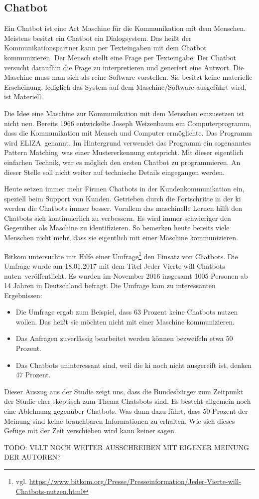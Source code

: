 \subsection{Chatbot}
Ein Chatbot ist eine Art Maschine für die Kommunikation mit dem Menschen. Meistens besitzt ein Chatbot ein Dialogsystem. Das heißt der Kommunikationspartner kann per Texteingaben mit dem Chatbot kommunizieren. Der Mensch stellt eine Frage per Texteingabe. Der Chatbot versucht daraufhin die Frage zu interpretieren und generiert eine Antwort. Die Maschine muss man sich als reine Software vorstellen. Sie besitzt keine materielle Erscheinung, lediglich das System auf dem Maschine/Software ausgeführt wird, ist Materiell.

Die Idee eine Maschine zur Kommunikation mit dem Menschen einzusetzen ist nicht neu. Bereits 1966 entwickelte Joseph Weizenbaum ein Computerprogramm, dass die Kommunikation mit Mensch und Computer ermöglichte. Das Programm wird \glqq ELIZA\grqq\ genannt. Im Hintergrund verwendet das Programm ein sogenanntes \glqq Pattern Matching\grqq\, was einer Mustererkennung entspricht. Mit dieser eigentlich einfachen Technik, war es möglich den ersten Chatbot zu programmieren. An dieser Stelle soll nicht weiter auf technische Details eingegangen werden.    

Heute setzen immer mehr Firmen Chatbots in der Kundenkommunikation ein, speziell beim Support von Kunden. Getrieben durch die Fortschritte in der \ac{ki} werden die Chatbots immer besser. Vorallem das maschinelle Lernen hilft den Chatbots sich kontinuierlich zu verbessern. Es wird immer schwieriger den Gegenüber als Maschine zu identifizieren. So bemerken heute bereits viele Menschen nicht mehr, dass sie eigentlich mit einer Maschine kommunizieren. 

Bitkom untersuchte mit Hilfe einer Umfrage\footnote{vgl. \url{https://www.bitkom.org/Presse/Presseinformation/Jeder-Vierte-will-Chatbots-nutzen.html}} den Einsatz von Chatbots. Die Umfrage wurde am 18.01.2017 mit dem Titel \glqq Jeder Vierte will Chatbots nuten\grqq\ veröffentlicht. Es wurden im November 2016 insgesamt 1005 Personen ab 14 Jahren in Deutschland befragt. Die Umfrage kam zu interessanten Ergebnissen:
\begin{itemize}
 	\item Die Umfrage ergab zum Beispiel, dass 63 Prozent keine Chatbots nutzen wollen. Das heißt sie möchten nicht mit 		einer Maschine kommunizieren. 
	 \item Das Anfragen zuverlässig bearbeitet werden können bezweifeln etwa 50 Prozent.
	 \item Das Chatbots uninteressant sind, weil die \ac{ki} noch nicht ausgereift ist, denken 47 Prozent.
\end{itemize}
Dieser Auszug aus der Studie zeigt uns, dass die Bundesbürger zum Zeitpunkt der Studie eher skeptisch zum Thema Chatsbots sind. Es besteht allgemein noch eine Ablehnung gegenüber Chatbots. Was dann dazu führt, dass 50 Prozent der Meinung sind keine brauchbaren Informationen zu erhalten. Wie sich dieses Gefüge mit der Zeit verschieben wird kann keiner sagen.  

TODO: VLLT NOCH WEITER AUSSCHREIBEN MIT EIGENER MEINUNG DER AUTOREN?







